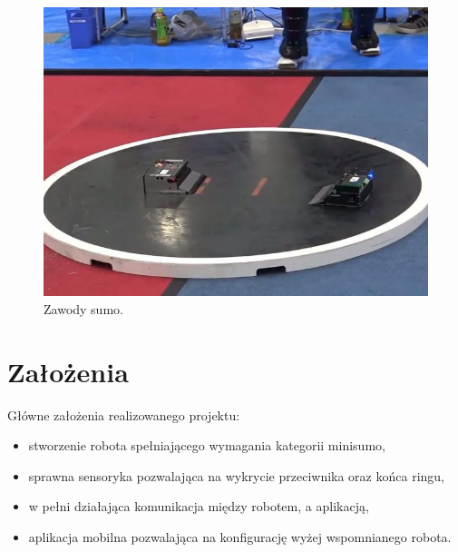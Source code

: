\begin{figure}[H]
	\centering
		\includegraphics[width=0.75\linewidth]{pic01/sumo_competitions.jpg}
	\caption{Zawody sumo.}
	\label{fig:sumo_competitions}	
\end{figure}

\section{Założenia}
Główne założenia realizowanego projektu:
\begin{itemize}
\item stworzenie robota spełniającego wymagania kategorii minisumo,
\item sprawna sensoryka pozwalająca na wykrycie przeciwnika oraz końca ringu,
\item w pełni działająca komunikacja między robotem, a aplikacją,
\item aplikacja mobilna pozwalająca na konfigurację wyżej wspomnianego robota.
\end{itemize}
